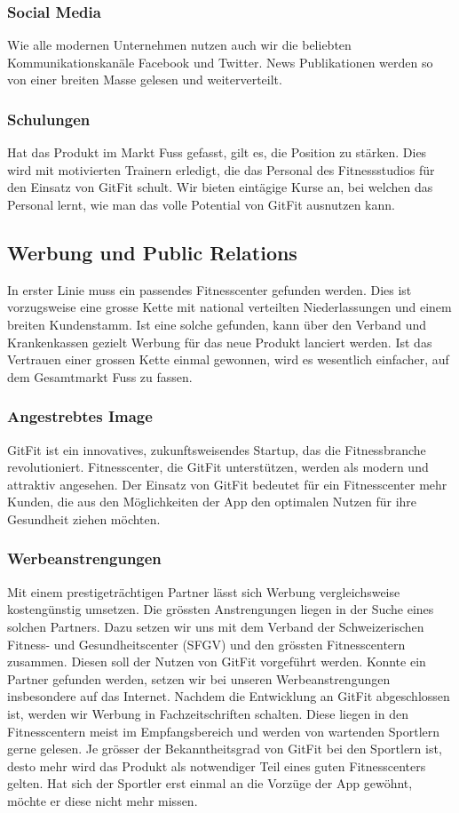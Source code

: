 \subsubsection{Social Media}
Wie alle modernen Unternehmen nutzen auch wir die beliebten
Kommunikationskanäle Facebook und Twitter. News Publikationen werden so
von einer breiten Masse gelesen und weiterverteilt.

\subsubsection{Schulungen}
Hat das Produkt im Markt Fuss gefasst, gilt es, die Position zu stärken. Dies wird mit motivierten Trainern erledigt, die das Personal des Fitnessstudios für den Einsatz von GitFit schult. Wir bieten eintägige Kurse an, bei welchen das Personal lernt, wie man das volle Potential von GitFit ausnutzen kann.

\subsection{Werbung und Public Relations}
In erster Linie muss ein passendes Fitnesscenter gefunden werden. Dies ist vorzugsweise eine grosse Kette mit national verteilten Niederlassungen und einem breiten Kundenstamm. Ist eine solche gefunden, kann über den Verband und Krankenkassen gezielt Werbung für das neue Produkt lanciert werden. Ist das Vertrauen einer grossen Kette einmal gewonnen, wird es wesentlich einfacher, auf dem Gesamtmarkt Fuss zu fassen.

\subsubsection{Angestrebtes Image}
GitFit ist ein innovatives, zukunftsweisendes Startup, das die Fitnessbranche revolutioniert. Fitnesscenter, die GitFit unterstützen, werden als modern und attraktiv angesehen. Der Einsatz von GitFit bedeutet für ein Fitnesscenter mehr Kunden, die aus den Möglichkeiten der App den optimalen Nutzen für ihre Gesundheit ziehen möchten.

\subsubsection{Werbeanstrengungen}
Mit einem prestigeträchtigen Partner lässt sich Werbung vergleichsweise kostengünstig umsetzen. Die grössten Anstrengungen liegen in der Suche eines solchen Partners. Dazu setzen wir uns mit dem Verband der Schweizerischen Fitness- und Gesundheitscenter (SFGV) und den grössten Fitnesscentern zusammen. Diesen soll der Nutzen von GitFit vorgeführt werden. Konnte ein Partner gefunden werden, setzen wir bei unseren Werbeanstrengungen insbesondere auf das Internet. Nachdem die Entwicklung an GitFit abgeschlossen ist, werden wir Werbung in Fachzeitschriften schalten. Diese liegen in den Fitnesscentern meist im Empfangsbereich und werden von wartenden Sportlern gerne gelesen. Je grösser der Bekanntheitsgrad von GitFit bei den Sportlern ist, desto mehr wird das Produkt als notwendiger Teil eines guten Fitnesscenters gelten. Hat sich der Sportler erst einmal an die Vorzüge der App gewöhnt, möchte er diese nicht mehr missen.

